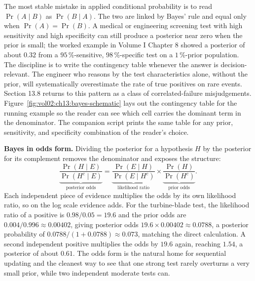 The most stable mistake in applied conditional probability is to
read $\Pr(A \mid B)$ as $\Pr(B \mid A)$. The two are linked by
Bayes' rule and equal only when $\Pr(A) = \Pr(B)$. A medical or
engineering screening test with high sensitivity and high
specificity can still produce a posterior near zero when the prior
is small; the worked example in Volume I Chapter 8 showed a
posterior of about $0.32$ from a $95\,\%$-sensitive, $98\,\%$-specific
test on a $1\,\%$-prior population. The discipline is to write the
contingency table whenever the answer is decision-relevant. The
engineer who reasons by the test characteristics alone, without the
prior, will systematically overestimate the rate of true positives
on rare events. Section 13.8 returns to this pattern as a class of
correlated-failure misjudgements.
Figure~\ref{fig:vol02:ch13:bayes-schematic} lays out the
contingency table for the running example so the reader can see
which cell carries the dominant term in the denominator. The
companion script
prints the same table for any prior, sensitivity, and specificity
combination of the reader's choice.



\begin{mastery}
\textbf{Bayes in odds form.} Dividing the posterior for a
hypothesis $H$ by the posterior for its complement removes the
denominator and exposes the structure:
\[
\underbrace{\frac{\Pr(H \mid E)}{\Pr(H^{c} \mid E)}}
_{\text{posterior odds}}
=
\underbrace{\frac{\Pr(E \mid H)}{\Pr(E \mid H^{c})}}
_{\text{likelihood ratio}}
\times
\underbrace{\frac{\Pr(H)}{\Pr(H^{c})}}
_{\text{prior odds}}.
\]
Each independent piece of evidence multiplies the odds by its own
likelihood ratio, so on the log scale evidence adds. For the
turbine-blade test, the likelihood ratio of a positive is
$0.98/0.05 = 19.6$ and the prior odds are
$0.004/0.996 \approx 0.00402$, giving posterior odds
$19.6 \times 0.00402 \approx 0.0788$, a posterior probability of
$0.0788/(1 + 0.0788) \approx 0.073$, matching the direct
calculation. A second independent positive multiplies the odds by
$19.6$ again, reaching $1.54$, a posterior of about $0.61$. The
odds form is the natural home for sequential updating and the
cleanest way to see that one strong test rarely overturns a very
small prior, while two independent moderate tests can.
\end{mastery}


